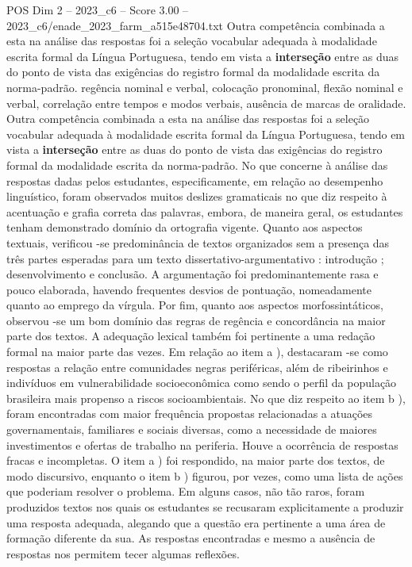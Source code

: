 \begin{textsample}{POS Dim 2 – 2023\_c6 – Score 3.00 – 2023\_c6/enade\_2023\_farm\_a515e48704.txt}
Outra competência combinada a esta na análise das respostas foi a seleção vocabular adequada à modalidade escrita formal da Língua Portuguesa, tendo em vista a \textbf{interseção} entre as duas do ponto de vista das exigências do registro formal da modalidade escrita da norma-padrão. regência nominal e verbal, colocação pronominal, flexão nominal e verbal, correlação entre tempos e modos verbais, ausência de marcas de oralidade.
Outra competência combinada a esta na análise das respostas foi a seleção vocabular adequada à modalidade escrita formal da Língua Portuguesa, tendo em vista a \textbf{interseção} entre as duas do ponto de vista das exigências do registro formal da modalidade escrita da norma-padrão.
No que concerne à análise das respostas dadas pelos estudantes, especificamente, em relação ao desempenho linguístico, foram observados muitos deslizes gramaticais no que diz respeito à acentuação e grafia correta das palavras, embora, de maneira geral, os estudantes tenham demonstrado domínio da ortografia vigente.
Quanto aos aspectos textuais, verificou -se predominância de textos organizados sem a presença das três partes esperadas para um texto dissertativo-argumentativo : introdução ; desenvolvimento e conclusão.
A argumentação foi predominantemente rasa e pouco elaborada, havendo frequentes desvios de pontuação, nomeadamente quanto ao emprego da vírgula.
Por fim, quanto aos aspectos morfossintáticos, observou -se um bom domínio das regras de regência e concordância na maior parte dos textos.
A adequação lexical também foi pertinente a uma redação formal na maior parte das vezes.
Em relação ao item a ), destacaram -se como respostas a relação entre comunidades negras periféricas, além de ribeirinhos e indivíduos em vulnerabilidade socioeconômica como sendo o perfil da população brasileira mais propenso a riscos socioambientais.
No que diz respeito ao item b ), foram encontradas com maior frequência propostas relacionadas a atuações governamentais, familiares e sociais diversas, como a necessidade de maiores investimentos e ofertas de trabalho na periferia.
Houve a ocorrência de respostas fracas e incompletas.
O item a ) foi respondido, na maior parte dos textos, de modo discursivo, enquanto o item b ) figurou, por vezes, como uma lista de ações que poderiam resolver o problema.
Em alguns casos, não tão raros, foram produzidos textos nos quais os estudantes se recusaram explicitamente a produzir uma resposta adequada, alegando que a questão era pertinente a uma área de formação diferente da sua.
As respostas encontradas e mesmo a ausência de respostas nos permitem tecer algumas reflexões.

\end{textsample}
